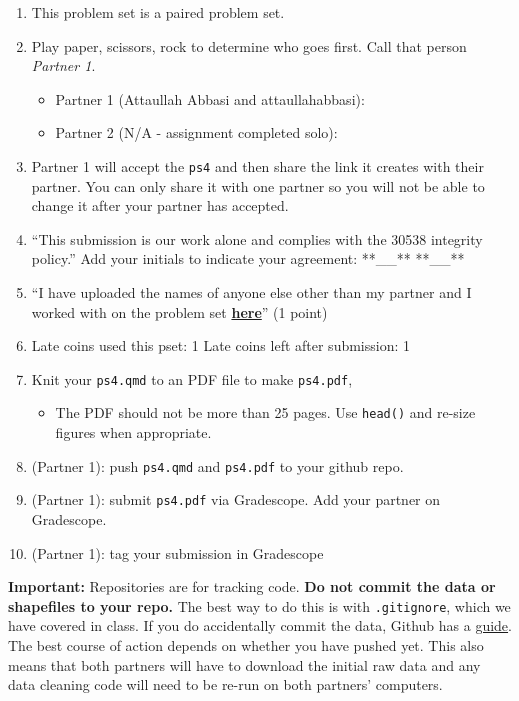 \documentclass[
  letterpaper,
  DIV=11,
  numbers=noendperiod]{scrartcl}
\providecommand{\tightlist}{%
  \setlength{\itemsep}{0pt}\setlength{\parskip}{0pt}}\usepackage{longtable,booktabs,array}
\begin{document}
\begin{enumerate}
\def\labelenumi{\arabic{enumi}.}
\tightlist
\item
  This problem set is a paired problem set.
\item
  Play paper, scissors, rock to determine who goes first. Call that
  person \emph{Partner 1}.

  \begin{itemize}
  \tightlist
  \item
    Partner 1 (Attaullah Abbasi and attaullahabbasi):
  \item
    Partner 2 (N/A - assignment completed solo):
  \end{itemize}
\item
  Partner 1 will accept the \texttt{ps4} and then share the link it
  creates with their partner. You can only share it with one partner so
  you will not be able to change it after your partner has accepted.
\item
  ``This submission is our work alone and complies with the 30538
  integrity policy.'' Add your initials to indicate your agreement:
  **\_\_** **\_\_**
\item
  ``I have uploaded the names of anyone else other than my partner and I
  worked with on the problem set
  \textbf{\href{https://docs.google.com/forms/d/185usrCREQaUbvAXpWhChkjghdGgmAZXA3lPWpXLLsts/edit}{here}}''
  (1 point)
\item
  Late coins used this pset: 1 Late coins left after submission: 1
\item
  Knit your \texttt{ps4.qmd} to an PDF file to make \texttt{ps4.pdf},

  \begin{itemize}
  \tightlist
  \item
    The PDF should not be more than 25 pages. Use \texttt{head()} and
    re-size figures when appropriate.
  \end{itemize}
\item
  (Partner 1): push \texttt{ps4.qmd} and \texttt{ps4.pdf} to your github
  repo.
\item
  (Partner 1): submit \texttt{ps4.pdf} via Gradescope. Add your partner
  on Gradescope.
\item
  (Partner 1): tag your submission in Gradescope
\end{enumerate}

\textbf{Important:} Repositories are for tracking code. \textbf{Do not
commit the data or shapefiles to your repo.} The best way to do this is
with \texttt{.gitignore}, which we have covered in class. If you do
accidentally commit the data, Github has a
\href{https://docs.github.com/en/repositories/working-with-files/managing-large-files/about-large-files-on-github\#removing-files-from-a-repositorys-history}{guide}.
The best course of action depends on whether you have pushed yet. This
also means that both partners will have to download the initial raw data
and any data cleaning code will need to be re-run on both partners'
computers.
\end{document}
